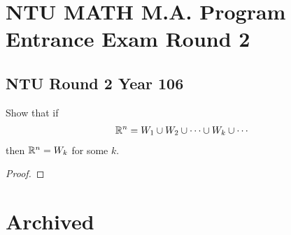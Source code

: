 \documentclass{report}
\begin{document}
\chapter{NTU MATH M.A. Program Entrance Exam Round 2}
\section{NTU Round 2 Year 106}
\begin{question}{}{}
Show that if 
 \begin{align*}
\mathbb{R}^n = W_1 \cup W_2 \cup  \cdots \cup  W_k \cup  \cdots  
\end{align*}
then $\mathbb{R}^n=W_k$ for some $k$. 
\end{question}
\begin{proof}

\end{proof}
\chapter{Archived}
\end{document}
